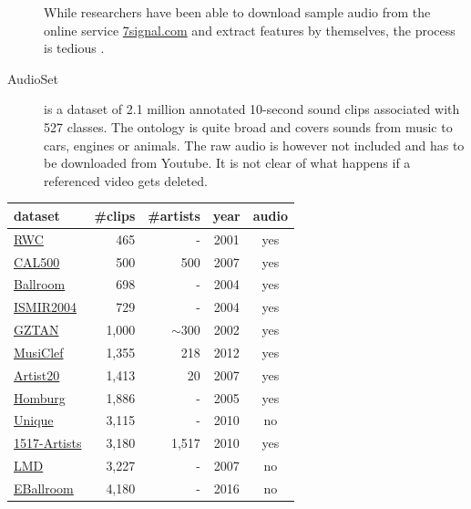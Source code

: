 \documentclass{article}
\begin{document}
\begin{description}
		While researchers have been able to download sample audio from the online service \url{7signal.com} and extract features by themselves, the process is tedious \cite{msd_features}.
	\item[AudioSet] \cite{audioset} is a dataset of 2.1 million annotated 10-second sound clips associated with 527 classes. The ontology is quite broad and covers sounds from music to cars, engines or animals. The raw audio is however not included and has to be downloaded from Youtube. It is not clear of what happens if a referenced video gets deleted.
\end{description}

\begin{table}
	\centering
	\begin{threeparttable}
	\begin{tabular}{lrrcc}
		\toprule
		dataset & \#clips & \#artists & year & audio \\
		\midrule
		\href{https://staff.aist.go.jp/m.goto/RWC-MDB/}{RWC} \cite{RWC} & 465 & - & 2001 & yes \\
		\href{http://calab1.ucsd.edu/~datasets/cal500/}{CAL500} \cite{cal500} & 500 & 500 & 2007 & yes \\
		\href{http://mtg.upf.edu/ismir2004/contest/tempoContest/node5.html}{Ballroom} \cite{ballroom} & 698 & - & 2004 & yes \\
		\href{http://ismir2004.ismir.net/genre_contest/}{ISMIR2004} & 729 & - & 2004 & yes \\
		\href{https://marsyasweb.appspot.com/download/data_sets/}{GZTAN} \cite{gtzan} & 1,000 & $\sim300$ & 2002 & yes \\
		\href{http://www.cp.jku.at/datasets/musiclef/}{MusiClef} \cite{musiclef} & 1,355 & 218 & 2012 & yes \\
		\href{https://labrosa.ee.columbia.edu/projects/artistid/}{Artist20} \cite{artist20} & 1,413 & 20 & 2007 & yes \\
		\href{http://www-ai.cs.uni-dortmund.de/audio.html}{Homburg} \cite{garageband} & 1,886 & - & 2005 & yes \\  %
		\href{http://www.seyerlehner.info/index.php?p=1_3_Download}{Unique} & 3,115 & - & 2010 & no \\
		\href{http://www.seyerlehner.info/index.php?p=1_3_Download}{1517-Artists} & 3,180 & 1,517 & 2010 & yes \\
		\href{http://www.ppgia.pucpr.br/~silla/lmd/}{LMD} \cite{lmd} & 3,227 & - & 2007 & no \\
		\href{http://anasynth.ircam.fr/home/media/ExtendedBallroom}{EBallroom} \cite{extballroom} & 4,180 & - & 2016 & no\tnote{1} \\

\end{tabular}
\end{threeparttable}
\end{table}
\end{document}
